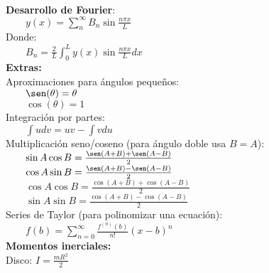 \documentclass[a4paper,landscape,10pt]{cheatsheet}
\begin{document}
\hfill\\
\textbf{Desarrollo de Fourier}:\\
$\qquad y(x)=\sum_{n}^{\infty} B_n\sin{\frac{n\pi x}{L}}$\\

Donde:\\
$\qquad B_n=\frac{2}{L}\int_{0}^{L}y(x)\sin{\frac{n\pi x}{L}}dx$\\


\textbf{Extras:}\\
Aproximaciones para ángulos pequeños:\\
$\qquad\sen(\theta)=\theta$\\
$\qquad\cos(\theta)=1$\\
Integración por partes:\\
$\qquad \int udv=uv-\int vdu$\\
Multiplicación seno/coseno (para ángulo doble usa $B=A$):\\
$\qquad \sin A\cos B=\frac{\sen(A+B)+\sen(A-B)}{2}$\\
$\qquad \cos A\sin B=\frac{\sen(A+B)-\sen(A-B)}{2}$\\
$\qquad \cos A\cos B=\frac{\cos(A+B)+\cos(A-B)}{2}$\\
$\qquad \sin A\sin B=\frac{\cos(A+B)-\cos(A-B)}{2}$\\
Series de Taylor (para polinomizar una ecuación):\\
$\qquad f(b)=\sum_{n = 0}^{\infty}\frac{f^{(n)}(b)}{n!}(x-b)^n$\\

\textbf{Momentos inerciales:}\\
Disco: $I=\frac{mR^2}{2}$\\
\end{document}
